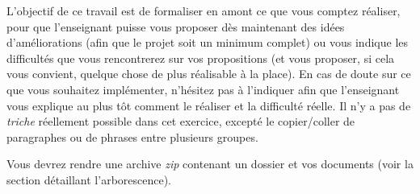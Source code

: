 \bigskip

\noindent L'objectif de ce travail est de formaliser en amont ce que vous comptez réaliser, pour que l'enseignant puisse vous proposer dès maintenant des idées d'améliorations (afin que le projet soit un minimum complet) ou vous indique les difficultés que vous rencontrerez sur vos propositions (et vous proposer, si cela vous convient, quelque chose de plus réalisable à la place).
En cas de doute sur ce que vous souhaitez implémenter, n'hésitez pas à l'indiquer afin que l'enseignant vous explique au plus tôt comment le réaliser et la difficulté réelle.
Il n'y a pas de \textit{triche} réellement possible dans cet exercice, excepté le copier/coller de paragraphes ou de phrases entre plusieurs groupes.


\bigskip

\noindent Vous devrez rendre une archive \textit{zip} contenant un dossier et vos documents (voir la section détaillant l'arborescence).

